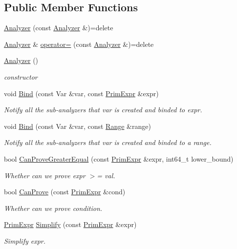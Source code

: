 \subsection*{Public Member Functions}
\begin{DoxyCompactItemize}
\item 
\hyperlink{classtvm_1_1arith_1_1Analyzer_af33491068003d13952289cd296ba63af}{Analyzer} (const \hyperlink{classtvm_1_1arith_1_1Analyzer}{Analyzer} \&)=delete
\item 
\hyperlink{classtvm_1_1arith_1_1Analyzer}{Analyzer} \& \hyperlink{classtvm_1_1arith_1_1Analyzer_a9dccc7d98b8b9465390e10436d3a9178}{operator=} (const \hyperlink{classtvm_1_1arith_1_1Analyzer}{Analyzer} \&)=delete
\item 
\hyperlink{classtvm_1_1arith_1_1Analyzer_ae8568eeee02c68849e468f8c19a2701d}{Analyzer} ()
\begin{DoxyCompactList}\small\item\em constructor \end{DoxyCompactList}\item 
void \hyperlink{classtvm_1_1arith_1_1Analyzer_a509393e0c96c4455d26dd2d737ba2251}{Bind} (const Var \&var, const \hyperlink{classtvm_1_1PrimExpr}{Prim\+Expr} \&expr)
\begin{DoxyCompactList}\small\item\em Notify all the sub-\/analyzers that var is created and binded to expr. \end{DoxyCompactList}\item 
void \hyperlink{classtvm_1_1arith_1_1Analyzer_ae24b097cad6d18e00eafa6a2a36d9712}{Bind} (const Var \&var, const \hyperlink{classtvm_1_1Range}{Range} \&range)
\begin{DoxyCompactList}\small\item\em Notify all the sub-\/analyzers that var is created and binded to a range. \end{DoxyCompactList}\item 
bool \hyperlink{classtvm_1_1arith_1_1Analyzer_a5e97e3abc176f85a5b8e5d0d1cb9f5e1}{Can\+Prove\+Greater\+Equal} (const \hyperlink{classtvm_1_1PrimExpr}{Prim\+Expr} \&expr, int64\+\_\+t lower\+\_\+bound)
\begin{DoxyCompactList}\small\item\em Whether can we prove expr $>$= val. \end{DoxyCompactList}\item 
bool \hyperlink{classtvm_1_1arith_1_1Analyzer_af84b3978b1df3b2680fb47818e5dc30d}{Can\+Prove} (const \hyperlink{classtvm_1_1PrimExpr}{Prim\+Expr} \&cond)
\begin{DoxyCompactList}\small\item\em Whether can we prove condition. \end{DoxyCompactList}\item 
\hyperlink{classtvm_1_1PrimExpr}{Prim\+Expr} \hyperlink{classtvm_1_1arith_1_1Analyzer_a2d2bda00f4b06ae8b9fc7bc1cd5b0020}{Simplify} (const \hyperlink{classtvm_1_1PrimExpr}{Prim\+Expr} \&expr)
\begin{DoxyCompactList}\small\item\em Simplify expr. \end{DoxyCompactList}\end{DoxyCompactItemize}
